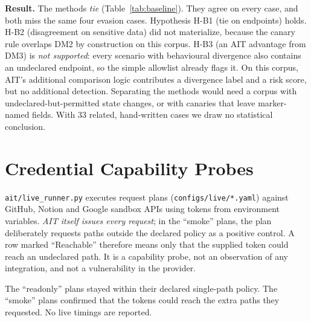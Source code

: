 \documentclass[12pt,a4paper]{report}
\begin{document}
\begin{table}[H]
    \centering
    \caption{AIT vs.\ Two-Part Baseline on the Development Corpus (identical traces; raw
    counts; author-written scenarios)}
    \label{tab:baseline}
    \footnotesize
    
\end{table}

\textbf{Result.} The methods \emph{tie} (Table~\ref{tab:baseline}). They agree on every case,
and both miss the same four evasion cases. Hypothesis H-B1 (tie on endpoints) holds. H-B2
(disagreement on sensitive data) did not materialize, because the canary rule overlaps DM2 by
construction on this corpus. H-B3 (an AIT advantage from DM3) is \emph{not supported}: every
scenario with behavioural divergence also contains an undeclared endpoint, so the simple
allowlist already flags it. On this corpus, AIT's additional comparison logic contributes a
divergence label and a risk score, but no additional detection. Separating the methods would
need a corpus with undeclared-but-permitted state changes, or with canaries that leave
marker-named fields. With 33 related, hand-written cases we draw no statistical conclusion.

\section{Credential Capability Probes}
\label{sec:livesaas}

\texttt{ait/live\_runner.py} executes request plans (\texttt{configs/live/*.yaml}) against
GitHub, Notion and Google sandbox APIs using tokens from environment variables. \emph{AIT itself
issues every request}; in the ``smoke'' plans, the plan deliberately requests paths outside the
declared policy as a positive control. A row marked ``Reachable'' therefore means only that the
supplied token could reach an undeclared path. It is a capability probe, not an observation of
any integration, and not a vulnerability in the provider.

\begin{table}[H]
    \centering
    \caption{Credential Capability Probes (AIT-issued requests, sandbox accounts; not
    integration behaviour)}
    \label{tab:live-results}
    \footnotesize
    \resizebox{\textwidth}{!}{}
\end{table}

The ``readonly'' plans stayed within their declared single-path policy. The ``smoke'' plans
confirmed that the tokens could reach the extra paths they requested. No live timings are
reported.
\end{document}
